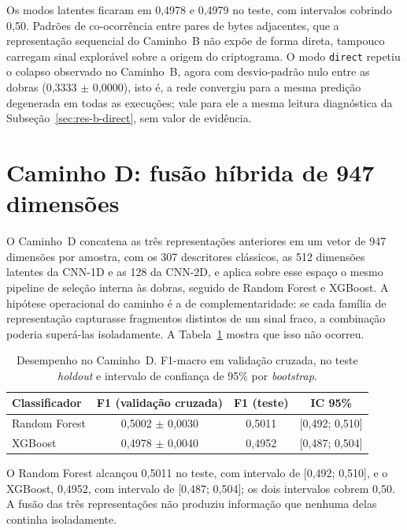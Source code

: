 Os modos latentes ficaram em 0,4978 e 0,4979 no teste, com intervalos cobrindo 0,50. Padrões de co-ocorrência entre pares de bytes adjacentes, que a representação sequencial do Caminho~B não expõe de forma direta, tampouco carregam sinal explorável sobre a origem do criptograma. O modo \texttt{direct} repetiu o colapso observado no Caminho~B, agora com desvio-padrão nulo entre as dobras (0,3333 $\pm$ 0,0000), isto é, a rede convergiu para a mesma predição degenerada em todas as execuções; vale para ele a mesma leitura diagnóstica da Subseção~\ref{sec:res-b-direct}, sem valor de evidência.

\section{Caminho D: fusão híbrida de 947 dimensões}
\label{sec:res-caminho-d}

O Caminho~D concatena as três representações anteriores em um vetor de 947 dimensões por amostra, com os 307 descritores clássicos, as 512 dimensões latentes da CNN-1D e as 128 da CNN-2D, e aplica sobre esse espaço o mesmo pipeline de seleção interna às dobras, seguido de Random Forest e XGBoost. A hipótese operacional do caminho é a de complementaridade: se cada família de representação capturasse fragmentos distintos de um sinal fraco, a combinação poderia superá-las isoladamente. A Tabela~\ref{tab:res-d} mostra que isso não ocorreu.

\begin{table}[htb]
\centering
\caption{Desempenho no Caminho~D. F1-macro em validação cruzada, no teste \textit{holdout} e intervalo de confiança de 95\% por \textit{bootstrap}.}
\label{tab:res-d}
\begin{tabular}{lccc}
\toprule
Classificador & F1 (validação cruzada) & F1 (teste) & IC 95\% \\
\midrule
Random Forest & 0,5002 $\pm$ 0,0030 & 0,5011 & [0,492; 0,510] \\
XGBoost       & 0,4978 $\pm$ 0,0040 & 0,4952 & [0,487; 0,504] \\
\bottomrule
\end{tabular}
\end{table}

O Random Forest alcançou 0,5011 no teste, com intervalo de [0,492; 0,510], e o XGBoost, 0,4952, com intervalo de [0,487; 0,504]; os dois intervalos cobrem 0,50. A fusão das três representações não produziu informação que nenhuma delas continha isoladamente.

